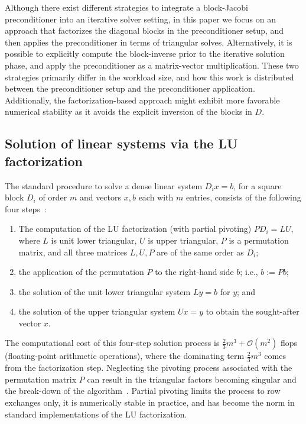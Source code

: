 Although there exist different strategies to integrate a block-Jacobi preconditioner
into an iterative solver setting, in this paper we focus on an approach that
factorizes the diagonal blocks in the preconditioner setup,
and then applies the preconditioner in terms of triangular solves.
Alternatively, it is possible to explicitly compute the block-inverse prior to the 
iterative solution phase, and apply the preconditioner as
a matrix-vector multiplication. 
These two strategies primarily differ in the workload size, and how this work is distributed
between the preconditioner setup and the preconditioner application.
Additionally, the factorization-based approach might exhibit more favorable 
numerical stability as it avoids the explicit inversion of the blocks in $D$.



\subsection{Solution of linear systems via the LU factorization}

The standard procedure to solve a dense linear system $D_ix=b$, 
for a square block $D_i$ of order $m$ and vectors $x,b$ each with $m$ entries, 
consists of the following four steps~\cite{GVL3}:
\begin{enumerate}
\item The computation of the LU factorization (with partial pivoting)
         $PD_i=LU$, where $L$ is unit lower triangular, $U$ is upper triangular, $P$ is a permutation matrix, and all three
         matrices $L,U,P$ are of the same order as $D_i$;
\item the application of the permutation $P$ to the right-hand side $b$; i.e., $b:=Pb$;
\item the solution of the unit lower triangular system $Ly=b$ for $y$; and
\item the solution of the upper triangular system $Ux=y$ to obtain the sought-after vector $x$.
\end{enumerate}
The computational cost of 
this four-step solution process is
$\frac{2}{3}m^3+\mathcal{O}(m^2)$ flops (floating-point arithmetic operations), where the dominating 
term $\frac{2}{3}m^3$ comes from the factorization step.
Neglecting the pivoting process associated with the permutation matrix $P$ can result in the triangular factors 
becoming singular and the break-down of the algorithm~\cite{GVL3}.
Partial pivoting limits the process to row exchanges only,
it is numerically stable in practice, and has become the norm in standard implementations of the LU factorization.

